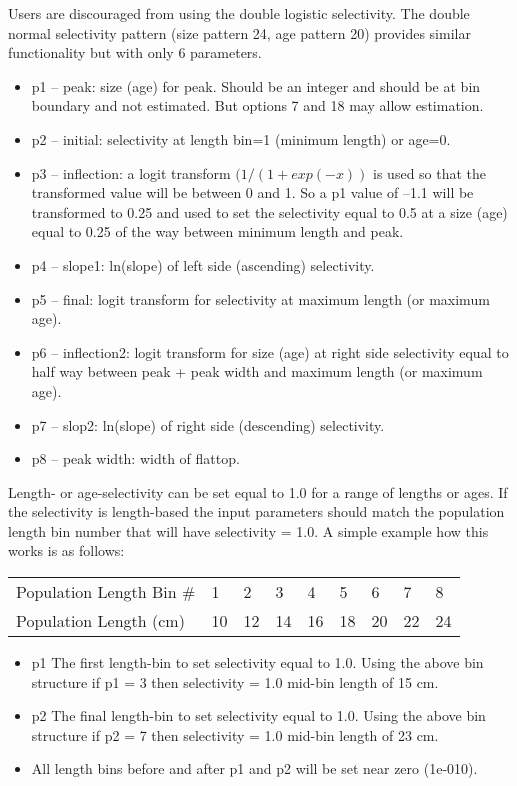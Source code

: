 Users are discouraged from using the double logistic selectivity. The double normal selectivity pattern (size pattern 24, age pattern 20) provides similar functionality but with only 6 parameters.
	\begin{itemize}
		\item  p1 – peak: size (age) for peak. Should be an integer and should be at bin boundary and not estimated.  But options 7 and 18 may allow estimation.
		\item p2 – initial: selectivity at length bin=1 (minimum length) or age=0.
		\item p3 – inflection: a logit transform $(1/(1+exp(-x))$ is used so that the transformed value will be between 0 and 1.  So a p1 value of –1.1 will be transformed to 0.25 and used to set the selectivity equal to 0.5 at a size (age) equal to 0.25 of the way between minimum length and peak. 
		\item p4 – slope1: ln(slope) of left side (ascending) selectivity.
		\item p5 – final: logit transform for selectivity at maximum length (or maximum age).
		\item p6 – inflection2:  logit transform for size (age) at right side selectivity equal to half way between peak + peak width and maximum length (or maximum age).
		\item p7 – slop2: ln(slope) of right side (descending) selectivity.
		\item p8 – peak width: width of flattop.
	\end{itemize}
	
Length- or age-selectivity can be set equal to 1.0 for a range of lengths or ages.  If the selectivity is length-based the input parameters should match the population length bin number that will have selectivity = 1.0. A simple example how this works is as follows:

\begin{longtable}{p{4cm} p{0.9cm} p{0.9cm} p{0.9cm}  p{0.9cm}  p{0.9cm} p{0.9cm} p{0.9cm} p{0.9cm}}
	\hline	
	Population Length Bin \# \Tstrut &  1 &  2 &  3 &  4 &  5 &  6 &  7 &  8 \\
	Population Length (cm)       & 10 & 12 & 14 & 16 & 18 & 20 & 22 & 24 \Bstrut\\
	\hline
\end{longtable} 

\begin{itemize}
	\item p1 The first length-bin to set selectivity equal to 1.0. Using the above bin structure if p1 = 3 then selectivity = 1.0 mid-bin length of 15 cm.
	\item p2 The final length-bin to set selectivity equal to 1.0. Using the above bin structure if p2 = 7 then selectivity = 1.0 mid-bin length of 23 cm.
	\item All length bins before and after p1 and p2 will be set near zero (1e-010).
\end{itemize}

